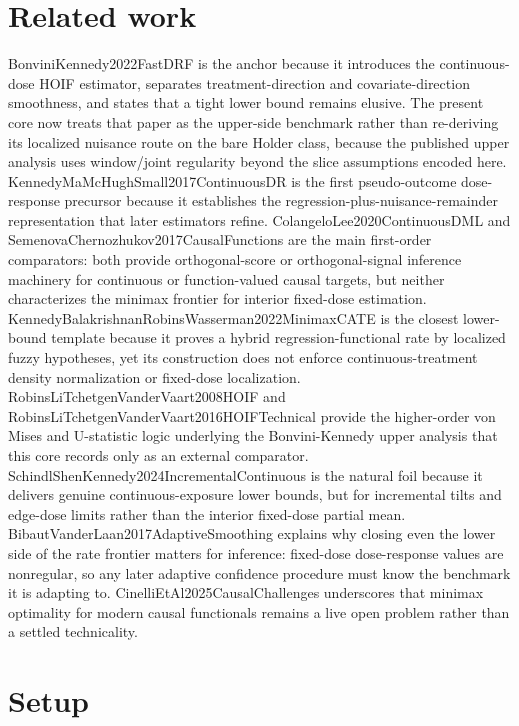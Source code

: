 \documentclass{article}
\begin{document}
\section{Related work}

BonviniKennedy2022FastDRF is the anchor because it introduces the continuous-dose HOIF estimator, separates treatment-direction and covariate-direction smoothness, and states that a tight lower bound remains elusive. The present core now treats that paper as the upper-side benchmark rather than re-deriving its localized nuisance route on the bare Holder class, because the published upper analysis uses window/joint regularity beyond the slice assumptions encoded here. KennedyMaMcHughSmall2017ContinuousDR is the first pseudo-outcome dose-response precursor because it establishes the regression-plus-nuisance-remainder representation that later estimators refine. ColangeloLee2020ContinuousDML and SemenovaChernozhukov2017CausalFunctions are the main first-order comparators: both provide orthogonal-score or orthogonal-signal inference machinery for continuous or function-valued causal targets, but neither characterizes the minimax frontier for interior fixed-dose estimation. KennedyBalakrishnanRobinsWasserman2022MinimaxCATE is the closest lower-bound template because it proves a hybrid regression-functional rate by localized fuzzy hypotheses, yet its construction does not enforce continuous-treatment density normalization or fixed-dose localization. RobinsLiTchetgenVanderVaart2008HOIF and RobinsLiTchetgenVanderVaart2016HOIFTechnical provide the higher-order von Mises and U-statistic logic underlying the Bonvini-Kennedy upper analysis that this core records only as an external comparator. SchindlShenKennedy2024IncrementalContinuous is the natural foil because it delivers genuine continuous-exposure lower bounds, but for incremental tilts and edge-dose limits rather than the interior fixed-dose partial mean. BibautVanderLaan2017AdaptiveSmoothing explains why closing even the lower side of the rate frontier matters for inference: fixed-dose dose-response values are nonregular, so any later adaptive confidence procedure must know the benchmark it is adapting to. CinelliEtAl2025CausalChallenges underscores that minimax optimality for modern causal functionals remains a live open problem rather than a settled technicality.

\section{Setup}
\end{document}
